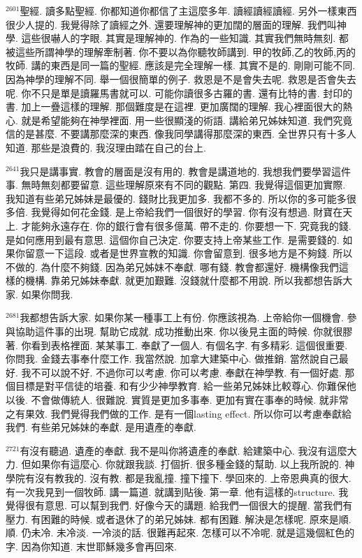 \documentclass{book}
\begin{document}
$^{2601}$聖經.
讀多點聖經.
你都知道你都信了主這麼多年.
讀經讀經讀經.
另外一樣東西很少人提的.
我覺得除了讀經之外.
還要理解神的更加闊的層面的理解.
我們叫神學.
這些很嚇人的字眼.
其實是理解神的.
作為的一些知識.
其實我們無時無刻.
都被這些所謂神學的理解牽制著.
你不要以為你聽牧師講到.
甲的牧師,乙的牧師,丙的牧師.
講的東西是同一篇的聖經.
應該是完全理解一樣.
其實不是的.
剛剛可能不同.
因為神學的理解不同.
舉一個很簡單的例子.
救恩是不是會失去呢.
救恩是否會失去呢.
你不只是單是讀羅馬書就可以.
可能你讀很多古羅的書.
還有比特的書.
封印的書.
加上一疊這樣的理解.
那個難度是在這裡.
更加廣闊的理解.
我心裡面很大的熱心.
就是希望能夠在神學裡面.
用一些很顯淺的術語.
講給弟兄姊妹知道.
我們究竟信的是甚麼.
不要講那麼深的東西.
像我同學講得那麼深的東西.
全世界只有十多人知道.
那些是浪費的.
我沒理由踏在自己的台上.

$^{2641}$我只是講事實.
教會的層面是沒有用的.
教會是講道地的.
我想我們要學習這件事.
無時無刻都要留意.
這些理解原來有不同的觀點.
第四.
我覺得這個更加實際.
我知道有些弟兄姊妹是最優的.
錢財比我更加多.
我都不多的.
所以你的多可能多很多倍.
我覺得如何花金錢.
是上帝給我們一個很好的學習.
你有沒有想過.
財寶在天上.
才能夠永遠存在.
你的銀行會有很多億萬.
帶不走的.
你要想一下.
究竟我的錢.
是如何應用到最有意思.
這個你自己決定.
你要支持上帝某些工作.
是需要錢的.
如果你留意一下這段.
或者是世界宣教的知識.
你會留意到.
很多地方是不夠錢.
所以不做的.
為什麼不夠錢.
因為弟兄姊妹不奉獻.
哪有錢.
教會都還好.
機構像我們這樣的機構.
靠弟兄姊妹奉獻.
就更加艱難.
沒錢就什麼都不用說.
所以我都想告訴大家.
如果你問我.

$^{2681}$我都想告訴大家.
如果你某一種事工上有份.
你應該視為.
上帝給你一個機會.
參與協助這件事的出現.
幫助它成就.
成功推動出來.
你以後見主面的時候.
你就很膠著.
你看到表格裡面.
某某事工.
奉獻了一個人.
有個名字.
有多精彩.
這個很重要.
你問我.
金錢去事奉什麼工作.
我當然說.
加拿大建築中心.
做推銷.
當然說自己最好.
我不可以說不好.
不過你可以考慮.
你可以考慮.
奉獻在神學教.
有一個好處.
那個目標是對平信徒的培養.
和有少少神學教育.
給一些弟兄姊妹比較尊心.
你難保他以後.
不會做傳統人.
很難說.
實質是更加多事奉.
更加有實在事奉的時候.
就非常之有果效.
我們覺得我們做的工作.
是有一個lasting effect.
所以你可以考慮奉獻給我們.
有些弟兄姊妹的奉獻.
是用遺產的奉獻.

$^{2721}$有沒有聽過.
遺產的奉獻.
我不是叫你將遺產的奉獻.
給建築中心.
我沒有這麼大力.
但如果你有這麼心.
你就跟我談.
打個折.
很多種金錢的幫助.
以上我所說的.
神學院有沒有教我的.
沒有教.
都是我亂撞.
撞下撞下.
學回來的.
上帝恩典真的很大.
有一次我見到一個牧師.
講一篇道.
就講到貼後.
第一章.
他有這樣的structure.
我覺得很有意思.
可以幫到我們.
好像今天的講題.
給我們一個很大的提醒.
當我們有壓力.
有困難的時候.
或者退休了的弟兄姊妹.
都有困難.
解決是怎樣呢.
原來是順.
順.
仍未冷.
未冷淡.
一冷淡的話.
很難再起來.
怎樣可以不冷呢.
就是這幾個紅色的字.
因為你知道.
末世耶穌幾多會再回來.
\end{document}
